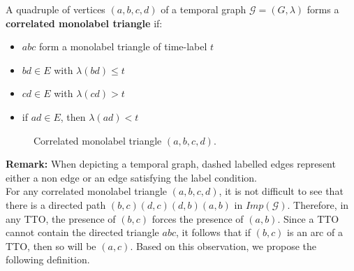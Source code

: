 \documentclass[runningheads]{llncs}
\begin{document}
\begin{definition}
A quadruple of vertices $(a,b,c,d)$ of a temporal graph $\mathcal{G}=(G,\lambda)$ forms a \textbf{correlated monolabel triangle} if: 
\begin{itemize}
    \item $abc$ form a monolabel triangle of time-label $t$
    \item $bd \in E$ with $\lambda(bd)\leq t$
    \item $cd \in E$ with $\lambda(cd) > t$
    \item if $ad \in E$, then $\lambda(ad) < t$
\end{itemize}
\end{definition}
\begin{figure}[H]
\begin{center}

\vspace{-2em}
\end{center}
\caption{Correlated monolabel triangle $(a,b,c,d)$.}
\label{fig:bad-quadruple}
\end{figure}

{\noindent\bf Remark:} When depicting a temporal graph, dashed labelled edges represent either a non edge or an edge satisfying the label condition.\\

For any correlated monolabel triangle $(a,b,c,d)$, it is not difficult to see that there is a directed path $(b,c)(d,c)(d,b)(a,b)$ in $Imp(\mathcal{G})$. Therefore, in any TTO, the presence of $(b,c)$  forces the presence of $(a,b)$. Since a TTO cannot contain the directed triangle $abc$, it follows that if $(b,c)$ is an arc of a TTO, then so will be $(a,c)$. Based on this observation, we propose the following definition.
\end{document}

